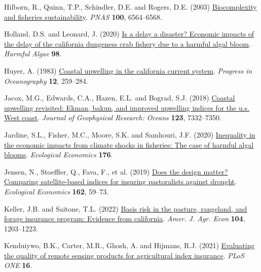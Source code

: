 \documentclass[
  letterpaper,
  DIV=11,
  numbers=noendperiod]{scrartcl}
\newlength{\cslhangindent}
\newlength{\cslentryspacingunit} %
\newenvironment{CSLReferences}[2] %
 {%
  \setlength{\parindent}{0pt}
  \ifodd #1
  \let\oldpar\par
  \def\par{\hangindent=\cslhangindent\oldpar}
  \fi
  \setlength{\parskip}{#2\cslentryspacingunit}
 }%
 {}
\begin{document}
\begin{CSLReferences}{1}{0}
\leavevmode{}%
Hilborn, R., Quinn, T.P., Schindler, D.E. and Rogers, D.E. (2003)
\href{https://doi.org/10.1073/pnas.103727410}{Biocomplexity and
fisheries sustainability}. \emph{PNAS} \textbf{100}, 6564--6568.

\leavevmode{}%
Holland, D.S. and Leonard, J. (2020)
\href{https://doi.org/10.1016/j.hal.2020.101904}{Is a delay a disaster?
Economic impacts of the delay of the california dungeness crab fishery
due to a harmful algal bloom}. \emph{Harmful Algae} \textbf{98}.

\leavevmode{}%
Huyer, A. (1983)
\href{https://doi.org/10.1016/0079-6611(83)90010-1}{Coastal upwelling in
the california current system}. \emph{Progress in Oceanography}
\textbf{12}, 259--284.

\leavevmode{}%
Jacox, M.G., Edwards, C.A., Hazen, E.L. and Bograd, S.J. (2018)
\href{https://doi.org/10.1029/2018JC014187}{Coastal upwelling revisited:
Ekman, bakun, and improved upwelling indices for the u.s. West coast}.
\emph{Journal of Geophysical Research: Oceans} \textbf{123}, 7332--7350.

\leavevmode{}%
Jardine, S.L., Fisher, M.C., Moore, S.K. and Samhouri, J.F. (2020)
\href{https://doi.org/10.1016/j.ecolecon.2020.106691}{Inequality in the
economic impacts from climate shocks in fisheries: The case of harmful
algal blooms}. \emph{Ecological Economics} \textbf{176}.

\leavevmode{}%
Jensen, N., Stoeffler, Q., Fava, F., et al. (2019)
\href{https://doi.org/10.1016/J.ECOLECON.2019.04.014}{Does the design
matter? Comparing satellite-based indices for insuring pastoralists
against drought}. \emph{Ecological Economics} \textbf{162}, 59--73.

\leavevmode{}%
Keller, J.B. and Saitone, T.L. (2022)
\href{https://doi.org/10.1111/ajae.12282}{Basis risk in the pasture,
rangeland, and forage insurance program: Evidence from california}.
\emph{Amer. J. Agr. Econ} \textbf{104}, 1203--1223.

\leavevmode{}%
Kenduiywo, B.K., Carter, M.R., Ghosh, A. and Hijmans, R.J. (2021)
\href{https://doi.org/10.1371/journal.pone.0258215}{Evaluating the
quality of remote sensing products for agricultural index insurance}.
\emph{PLoS ONE} \textbf{16}.


\end{CSLReferences}
\end{document}
